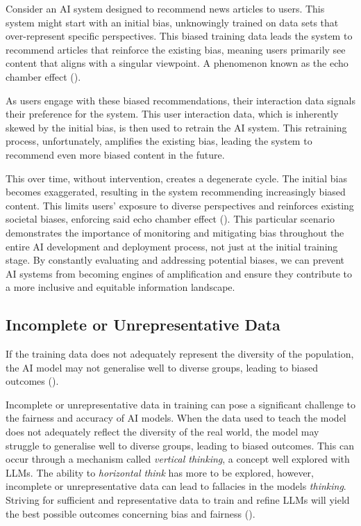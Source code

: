 \documentclass[12pt]{article}
\begin{document}
Consider an AI system designed to recommend news articles to users. This system might start with an initial bias, unknowingly trained on data sets that over-represent specific perspectives. This biased training data leads the system to recommend articles that reinforce the existing bias, meaning users primarily see content that aligns with a singular viewpoint. A phenomenon known as the echo chamber effect (\cite{kitchens-2020}).

As users engage with these biased recommendations, their interaction data signals their preference for the system. This user interaction data, which is inherently skewed by the initial bias, is then used to retrain the AI system. This retraining process, unfortunately, amplifies the existing bias, leading the system to recommend even more biased content in the future.

This over time, without intervention, creates a degenerate cycle. The initial bias becomes exaggerated, resulting in the system recommending increasingly biased content. This limits users' exposure to diverse perspectives and reinforces existing societal biases, enforcing said echo chamber effect (\cite{kitchens-2020}). This particular scenario demonstrates the importance of monitoring and mitigating bias throughout the entire AI development and deployment process, not just at the initial training stage. By constantly evaluating and addressing potential biases, we can prevent AI systems from becoming engines of amplification and ensure they contribute to a more inclusive and equitable information landscape.

\subsection{Incomplete or Unrepresentative Data}

If the training data does not adequately represent the diversity of the population, the AI model may not generalise well to diverse groups, leading to biased outcomes (\cite{marwala-2023}). 

Incomplete or unrepresentative data in training can pose a significant challenge to the fairness and accuracy of AI models. When the data used to teach the model does not adequately reflect the diversity of the real world, the model may struggle to generalise well to diverse groups, leading to biased outcomes. This can occur through a mechanism called \textit{vertical thinking}, a concept well explored with LLMs. The ability to \textit{horizontal think} has more to be explored, however, incomplete or unrepresentative data can lead to fallacies in the models \textit{thinking}. Striving for sufficient and representative data to train and refine LLMs will yield the best possible outcomes concerning bias and fairness (\cite{huang-2023}).
\end{document}
